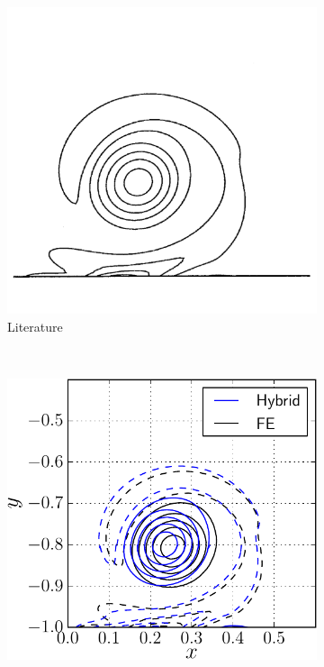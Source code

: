 	\begin{figure}[!p]
     \centering
     \begin{subfigure}[t]{0.4\textwidth}
             \includegraphics[width=\textwidth]{figures/eulerian/VorticityContourPlot-rotated270.pdf}
             \caption{Literature}
             \label{fig:hybrid_VorticityContourPlot}
     \end{subfigure}%
     ~ %
     \begin{subfigure}[t]{0.5\textwidth}
             \includegraphics[width=\textwidth]{./figures/validation/cbColl/hybrid_doubleMonolope_contourComparison_t1-crop.pdf}

\end{subfigure}
\end{figure}
